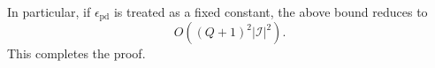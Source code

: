 \documentclass[lettersize,journal]{IEEEtran}
\begin{document}
In particular, if $\epsilon_{\mathrm{pd}}$ is treated as a fixed constant, the above bound reduces to
\[
O\!\left((Q+1)^2 |\mathcal I|^2\right).
\]
This completes the proof.



\end{document}
